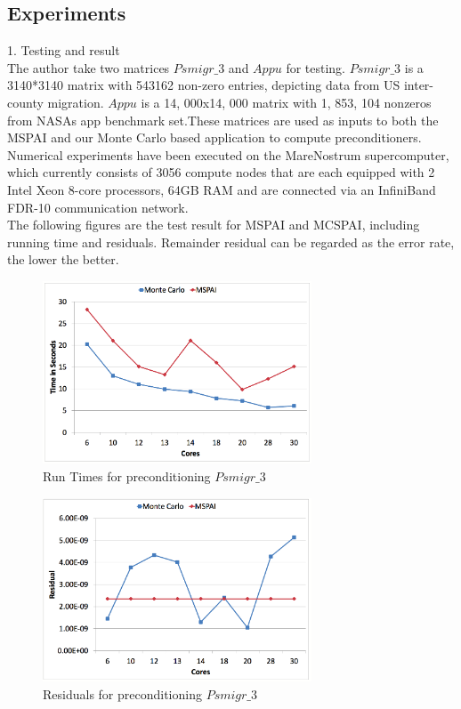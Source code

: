 \documentclass[10pt,journal]{IEEEtran}
\begin{document}
\subsection{Experiments}
1. Testing and result\\
The author take two matrices $Psmigr\_3$ and $Appu$ for testing. $Psmigr\_3$ is a 3140*3140 matrix with 543162 non-zero entries, depicting data from US inter-county migration. $Appu$ is a 14, 000x14, 000 matrix with 1, 853, 104 nonzeros from NASAs app benchmark set.These matrices are used as inputs to both the MSPAI and our Monte Carlo based application to compute preconditioners.\\
Numerical experiments have been executed on the MareNostrum supercomputer, which currently consists of 3056 compute nodes that are each equipped with 2 Intel Xeon 8-core processors, 64GB RAM and are connected via an InfiniBand FDR-10 communication network.\\
The following figures are the test result for MSPAI and MCSPAI, including running time and residuals. Remainder residual can be regarded as the error rate, the lower the better.\\
	\begin{figure}[htbp]
		\centering
			\includegraphics[width=8cm]{img/1}
			\caption[]{Run Times for preconditioning $Psmigr\_3$}
		
		
	\end{figure}
		\begin{figure}[htbp]
		\centering

			\includegraphics[width=8cm]{img/2}
			\caption[]{Residuals for preconditioning $Psmigr\_3$}
			
	
		
	\end{figure}
\end{document}
